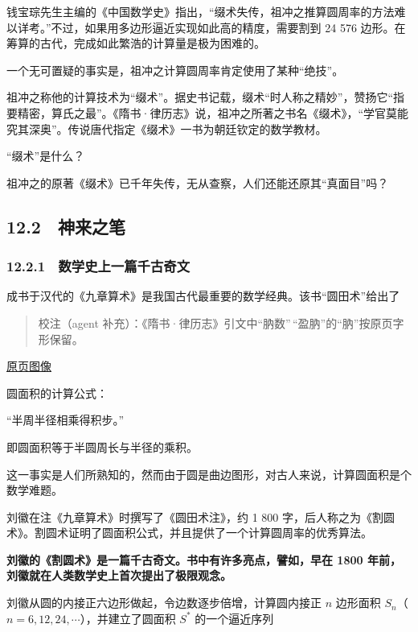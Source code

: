 \documentclass[
  10pt,
  fontset=fandol]{ctexart}
\begin{document}
钱宝琮先生主编的《中国数学史》指出，``缀术失传，祖冲之推算圆周率的方法难以详考。''不过，如果用多边形逼近实现如此高的精度，需要割到 24 576 边形。在筹算的古代，完成如此繁浩的计算量是极为困难的。

一个无可置疑的事实是，祖冲之计算圆周率肯定使用了某种``绝技''。

祖冲之称他的计算技术为``缀术''。据史书记载，缀术``时人称之精妙''，赞扬它``指要精密，算氏之最''。《隋书·律历志》说，祖冲之所著之书名《缀术》，``学官莫能究其深奥''。传说唐代指定《缀术》一书为朝廷钦定的数学教材。

``缀术''是什么？

祖冲之的原著《缀术》已千年失传，无从查察，人们还能还原其``真面目''吗？

\subsection{12.2　神来之笔}\label{ux795eux6765ux4e4bux7b14}

\subsubsection{12.2.1　数学史上一篇千古奇文}\label{ux6570ux5b66ux53f2ux4e0aux4e00ux7bc7ux5343ux53e4ux5947ux6587}

成书于汉代的《九章算术》是我国古代最重要的数学经典。该书``圆田术''给出了

\begin{quote}
校注（agent 补充）：《隋书·律历志》引文中``肭数''\,``盈肭''的``肭''按原页字形保留。
\end{quote}

\href{../../source-images/pdf-296.jpeg}{原页图像}

圆面积的计算公式：

``半周半径相乘得积步。''

即圆面积等于半圆周长与半径的乘积。

这一事实是人们所熟知的，然而由于圆是曲边图形，对古人来说，计算圆面积是个数学难题。

刘徽在注《九章算术》时撰写了《圆田术注》，约 1 800 字，后人称之为《割圆术》。割圆术证明了圆面积公式，并且提供了一个计算圆周率的优秀算法。

\textbf{刘徽的《割圆术》是一篇千古奇文。书中有许多亮点，譬如，早在 1800 年前，刘徽就在人类数学史上首次提出了极限观念。}

刘徽从圆的内接正六边形做起，令边数逐步倍增，计算圆内接正 \(n\) 边形面积 \(S_n\)（\(n=6,12,24,\cdots\)），并建立了圆面积 \(S^*\) 的一个逼近序列
\end{document}
